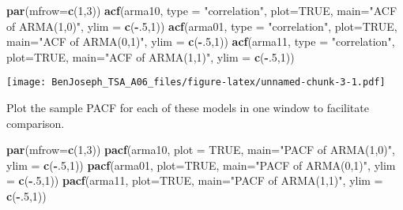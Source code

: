 \documentclass[
]{article}
\newenvironment{Shaded}{\begin{snugshade}}{\end{snugshade}}
\newcommand{\DataTypeTok}[1]{\textcolor[rgb]{0.13,0.29,0.53}{#1}}
\newcommand{\DecValTok}[1]{\textcolor[rgb]{0.00,0.00,0.81}{#1}}
\newcommand{\KeywordTok}[1]{\textcolor[rgb]{0.13,0.29,0.53}{\textbf{#1}}}
\newcommand{\NormalTok}[1]{#1}
\newcommand{\OperatorTok}[1]{\textcolor[rgb]{0.81,0.36,0.00}{\textbf{#1}}}
\newcommand{\OtherTok}[1]{\textcolor[rgb]{0.56,0.35,0.01}{#1}}
\newcommand{\StringTok}[1]{\textcolor[rgb]{0.31,0.60,0.02}{#1}}
\begin{document}
\begin{Shaded}
\begin{Highlighting}[]
\KeywordTok{par}\NormalTok{(}\DataTypeTok{mfrow=}\KeywordTok{c}\NormalTok{(}\DecValTok{1}\NormalTok{,}\DecValTok{3}\NormalTok{))}
\KeywordTok{acf}\NormalTok{(arma10, }\DataTypeTok{type =} \StringTok{"correlation"}\NormalTok{, }\DataTypeTok{plot=}\OtherTok{TRUE}\NormalTok{, }\DataTypeTok{main=}\StringTok{"ACF of ARMA(1,0)"}\NormalTok{, }\DataTypeTok{ylim =} \KeywordTok{c}\NormalTok{(}\OperatorTok{-}\NormalTok{.}\DecValTok{5}\NormalTok{,}\DecValTok{1}\NormalTok{))}
\KeywordTok{acf}\NormalTok{(arma01, }\DataTypeTok{type =} \StringTok{"correlation"}\NormalTok{, }\DataTypeTok{plot=}\OtherTok{TRUE}\NormalTok{, }\DataTypeTok{main=}\StringTok{"ACF of ARMA(0,1)"}\NormalTok{, }\DataTypeTok{ylim =} \KeywordTok{c}\NormalTok{(}\OperatorTok{-}\NormalTok{.}\DecValTok{5}\NormalTok{,}\DecValTok{1}\NormalTok{))}
\KeywordTok{acf}\NormalTok{(arma11, }\DataTypeTok{type =} \StringTok{"correlation"}\NormalTok{, }\DataTypeTok{plot=}\OtherTok{TRUE}\NormalTok{, }\DataTypeTok{main=}\StringTok{"ACF of ARMA(1,1)"}\NormalTok{, }\DataTypeTok{ylim =} \KeywordTok{c}\NormalTok{(}\OperatorTok{-}\NormalTok{.}\DecValTok{5}\NormalTok{,}\DecValTok{1}\NormalTok{))}
\end{Highlighting}
\end{Shaded}

\texttt{[image: BenJoseph\_TSA\_A06\_files/figure-latex/unnamed-chunk-3-1.pdf]}

\item

Plot the sample PACF for each of these models in one window to
facilitate comparison.

\begin{Shaded}
\begin{Highlighting}[]
\KeywordTok{par}\NormalTok{(}\DataTypeTok{mfrow=}\KeywordTok{c}\NormalTok{(}\DecValTok{1}\NormalTok{,}\DecValTok{3}\NormalTok{))}
\KeywordTok{pacf}\NormalTok{(arma10, }\DataTypeTok{plot =} \OtherTok{TRUE}\NormalTok{, }\DataTypeTok{main=}\StringTok{"PACF of ARMA(1,0)"}\NormalTok{, }\DataTypeTok{ylim =} \KeywordTok{c}\NormalTok{(}\OperatorTok{-}\NormalTok{.}\DecValTok{5}\NormalTok{,}\DecValTok{1}\NormalTok{))}
\KeywordTok{pacf}\NormalTok{(arma01, }\DataTypeTok{plot=}\OtherTok{TRUE}\NormalTok{, }\DataTypeTok{main=}\StringTok{"PACF of ARMA(0,1)"}\NormalTok{, }\DataTypeTok{ylim =} \KeywordTok{c}\NormalTok{(}\OperatorTok{-}\NormalTok{.}\DecValTok{5}\NormalTok{,}\DecValTok{1}\NormalTok{))}
\KeywordTok{pacf}\NormalTok{(arma11, }\DataTypeTok{plot=}\OtherTok{TRUE}\NormalTok{, }\DataTypeTok{main=}\StringTok{"PACF of ARMA(1,1)"}\NormalTok{, }\DataTypeTok{ylim =} \KeywordTok{c}\NormalTok{(}\OperatorTok{-}\NormalTok{.}\DecValTok{5}\NormalTok{,}\DecValTok{1}\NormalTok{))}
\end{Highlighting}
\end{Shaded}
\end{document}
